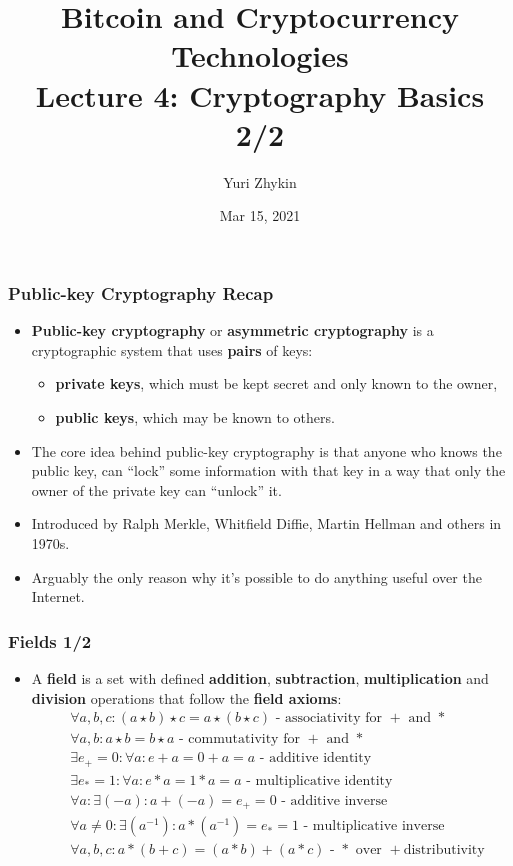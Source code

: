 \documentclass{beamer}
\title{
  Bitcoin and Cryptocurrency Technologies \\
  Lecture 4: Cryptography Basics 2/2
}
\author{Yuri Zhykin}
\date{Mar 15, 2021}
\begin{document}
\frame{\titlepage}

\begin{frame}
  \frametitle{Public-key Cryptography Recap}
  \begin{itemize}
  \item \textbf{Public-key cryptography} or \textbf{asymmetric cryptography} is
    a cryptographic system that uses \textbf{pairs} of keys:
    \begin{itemize}
    \item \textbf{private keys}, which must be kept secret and only known to the
      owner,
    \item \textbf{public keys}, which may be known to others.
    \end{itemize}
  \item The core idea behind public-key cryptography is that anyone who knows
    the public key, can ``lock'' some information with that key in a way that
    only the owner of the private key can ``unlock'' it.
  \item Introduced by Ralph Merkle, Whitfield Diffie, Martin Hellman and others
    in 1970s.
  \item Arguably the only reason why it's possible to do anything useful over
    the Internet.
  \end{itemize}
\end{frame}

\begin{frame}
  \frametitle{Fields 1/2}
  \begin{itemize}
  \item A \textbf{field} is a set with defined \textbf{addition},
    \textbf{subtraction}, \textbf{multiplication} and \textbf{division}
    operations that follow the \textbf{field axioms}:
    \begin{align*}
      &\forall a, b, c: (a \star b) \star c = a \star (b \star c) \text{ -
        associativity for $+$ and $*$} \\
      &\forall a, b: a \star b = b \star a \text{ - commutativity for $+$ and
        $*$} \\
      &\exists e_+ = 0: \forall a: e + a = 0 + a = a \text{ - additive identity}
      \\
      &\exists e_* = 1: \forall a: e * a = 1 * a = a \text{ - multiplicative
        identity} \\
      &\forall a: \exists (-a): a + (-a) = e_+ = 0 \text{ - additive inverse} \\
      &\forall a \neq 0: \exists (a^{-1}): a * (a^{-1}) = e_* = 1 \text{ -
        multiplicative inverse} \\
      &\forall a, b, c: a*(b+c) = (a*b) + (a*c) \text{ - $*$ over $+$
        distributivity} \\
    \end{align*}
  \end{itemize}
\end{frame}
\end{document}
